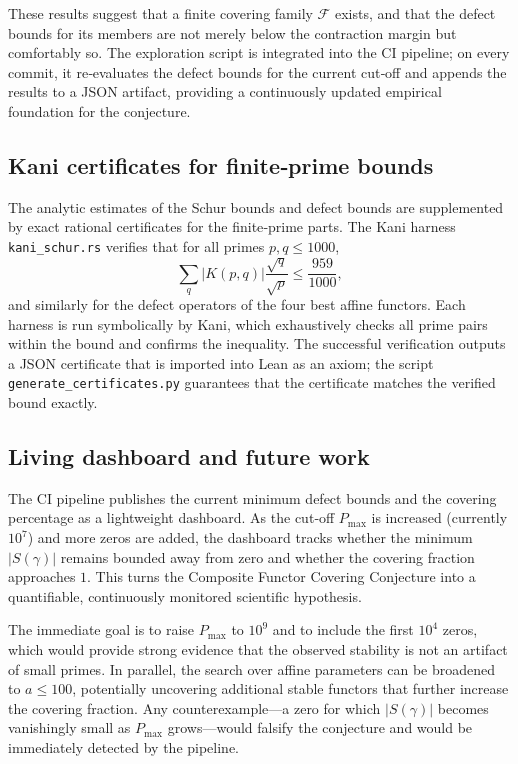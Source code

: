 \documentclass[11pt,reqno]{amsart}
\theoremstyle{definition}
\theoremstyle{remark}
\begin{document}
These results suggest that a finite covering family \(\mathcal F\) exists, and that the defect bounds for its members are not merely below the contraction margin but comfortably so.  The exploration script is integrated into the CI pipeline; on every commit, it re‑evaluates the defect bounds for the current cut‑off and appends the results to a JSON artifact, providing a continuously updated empirical foundation for the conjecture.

\subsection{Kani certificates for finite‑prime bounds}
\label{sec:kani-evidence}

The analytic estimates of the Schur bounds and defect bounds are supplemented by exact rational certificates for the finite‑prime parts.  The Kani harness \texttt{kani\_schur.rs} verifies that for all primes \(p,q\le 1000\),
\[
\sum_{q} |K(p,q)|\frac{\sqrt{q}}{\sqrt{p}} \le \frac{959}{1000},
\]
and similarly for the defect operators of the four best affine functors.  Each harness is run symbolically by Kani, which exhaustively checks all prime pairs within the bound and confirms the inequality.  The successful verification outputs a JSON certificate that is imported into Lean as an axiom; the script \texttt{generate\_certificates.py} guarantees that the certificate matches the verified bound exactly.

\subsection{Living dashboard and future work}
\label{sec:dashboard}

The CI pipeline publishes the current minimum defect bounds and the covering percentage as a lightweight dashboard.  As the cut‑off \(P_{\max}\) is increased (currently \(10^7\)) and more zeros are added, the dashboard tracks whether the minimum \(|S(\gamma)|\) remains bounded away from zero and whether the covering fraction approaches \(1\).  This turns the Composite Functor Covering Conjecture into a quantifiable, continuously monitored scientific hypothesis.

The immediate goal is to raise \(P_{\max}\) to \(10^9\) and to include the first \(10^4\) zeros, which would provide strong evidence that the observed stability is not an artifact of small primes.  In parallel, the search over affine parameters can be broadened to \(a\le 100\), potentially uncovering additional stable functors that further increase the covering fraction.  Any counterexample—a zero for which \(|S(\gamma)|\) becomes vanishingly small as \(P_{\max}\) grows—would falsify the conjecture and would be immediately detected by the pipeline.
\end{document}
